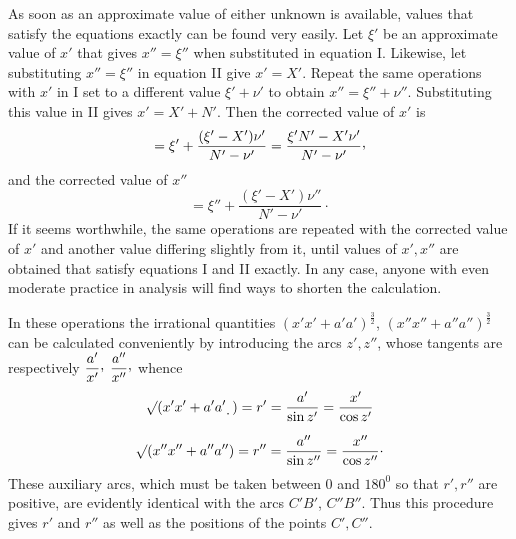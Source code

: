 As soon as an approximate value of either unknown is available, values that satisfy the equations exactly can be found very easily. Let $\xi'$ be an approximate value of $x'$ that gives $x''=\xi''$ when substituted in equation I. Likewise, let substituting $x''=\xi''$ in equation II give $x'=X'$. Repeat the same operations with $x'$ in I set to a different value $\xi'+\nu'$ to obtain $x''=\xi''+\nu''$. Substituting this value in II gives $x'=X'+N'$. Then the corrected value of $x'$ is
\[
=\xi'+\frac{(\xi'-X')\nu'}{N'-\nu'}=\frac{\xi'N'-X'\nu'}{N'-\nu'}\mathpunct{\raisebox{.45ex}{,}}
\]
and the corrected value of $x''$
\[
=\xi''+\frac{(\xi'-X')\nu''}{N'-\nu'}\mathpunct{\cdot}
\]
If it seems worthwhile, the same operations are repeated with the corrected value of $x'$ and another value differing slightly from it, until values of $x',x''$ are obtained that satisfy equations I and II exactly. In any case, anyone with even moderate practice in analysis will find ways to shorten the calculation.

In these operations the irrational quantities $(x'x'+a'a')^{\frac32}$, $(x''x''+a''a'')^{\frac32}$ can be calculated conveniently by introducing the arcs $z',z''$, whose tangents are respectively $\dfrac{a'}{x'}\mathpunct{\raisebox{.45ex}{,}}$ $\dfrac{a''}{x''}\mathpunct{\raisebox{.45ex}{,}}$ whence
\[
\begin{gathered}
\surd(x'x'+a'a'\mathpunct{\raisebox{-.5ex}{.}})=r'=\frac{a'}{\sin z'}=\frac{x'}{\cos z'}\\[.6em]
\surd(x''x''+a''a'')=r''=\frac{a''}{\sin z''}=\frac{x''}{\cos z''}\mathpunct{\cdot}
\end{gathered}
\]
These auxiliary arcs, which must be taken between $0$ and $180^0$ so that $r',r''$ are positive, are evidently identical with the arcs $C'B'$, $C''B''$. Thus this procedure gives $r'$ and $r''$ as well as the positions of the points $C',C''$.

